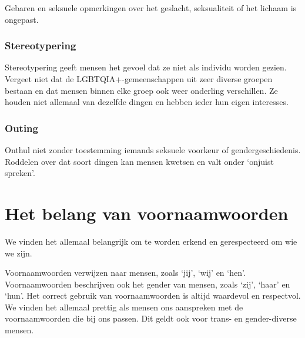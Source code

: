 \documentclass[12pt,openany]{book}
\begin{document}
Gebaren en seksuele opmerkingen over het geslacht, seksualiteit of het lichaam is ongepast.

\subsubsection*{Stereotypering}

Stereotypering geeft mensen het gevoel dat ze niet als individu worden gezien. Vergeet niet dat de LGBTQIA+-gemeenschappen uit zeer diverse groepen bestaan en dat mensen binnen elke groep ook weer onderling verschillen. Ze houden niet allemaal van dezelfde dingen en hebben ieder hun eigen interesses. 

\subsubsection*{Outing}

Onthul niet zonder toestemming iemands seksuele voorkeur of gendergeschiedenis. Roddelen over dat soort dingen kan mensen kwetsen en valt onder `onjuist spreken'.

\begin{figure}[h]
    \centering
\end{figure}

\section*{Het belang van voornaamwoorden}

We vinden het allemaal belangrijk om te worden erkend en gerespecteerd om wie we zijn.

Voornaamwoorden verwijzen naar mensen, zoals `jij', `wij' en `hen'. Voornaamwoorden beschrijven ook het gender van mensen, zoals `zij', `haar' en `hun'. Het correct gebruik van voornaamwoorden is altijd waardevol en respectvol. We vinden het allemaal prettig als mensen ons aanspreken met de voornaamwoorden die bij ons passen. Dit geldt ook voor trans- en gender-diverse mensen. 
\end{document}
